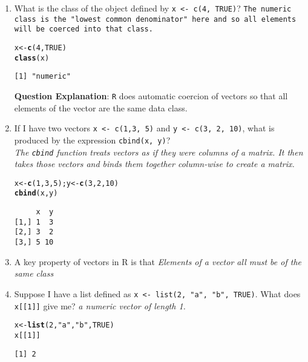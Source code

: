 \documentclass{article}\usepackage[]{graphicx}\usepackage[]{color}
\makeatletter
\newcommand{\hlnum}[1]{\textcolor[rgb]{0.686,0.059,0.569}{#1}}%
\newcommand{\hlstr}[1]{\textcolor[rgb]{0.192,0.494,0.8}{#1}}%
\newcommand{\hlstd}[1]{\textcolor[rgb]{0.345,0.345,0.345}{#1}}%
\newcommand{\hlkwb}[1]{\textcolor[rgb]{0.69,0.353,0.396}{#1}}%
\newcommand{\hlkwd}[1]{\textcolor[rgb]{0.737,0.353,0.396}{\textbf{#1}}}%
\newenvironment{kframe}{%
 \def\at@end@of@kframe{}%
 \ifinner\ifhmode%
  \def\at@end@of@kframe{\end{minipage}}%
  \begin{minipage}{\columnwidth}%
 \fi\fi%
 \def\FrameCommand##1{\hskip\@totalleftmargin \hskip-\fboxsep
 \colorbox{shadecolor}{##1}\hskip-\fboxsep
     \hskip-\linewidth \hskip-\@totalleftmargin \hskip\columnwidth}%
 \MakeFramed {\advance\hsize-\width
   \@totalleftmargin\z@ \linewidth\hsize
   \@setminipage}}%
 {\par\unskip\endMakeFramed%
 \at@end@of@kframe}
\newenvironment{knitrout}{}{} %
\makeatother
\begin{document}
\begin{enumerate}
  \item What is the class of the object defined by \texttt{x <- c(4, TRUE)}?
  \texttt{The numeric class is the "lowest common denominator" here and so all elements will be coerced into that class.}
\begin{knitrout}
\color{fgcolor}\begin{kframe}
\begin{alltt}
  \hlstd{x} \hlkwb{<-} \hlkwd{c}\hlstd{(}\hlnum{4}\hlstd{,} \hlnum{TRUE}\hlstd{)}
  \hlkwd{class}\hlstd{(x)}
\end{alltt}
\begin{verbatim}
[1] "numeric"
\end{verbatim}
\end{kframe}
\end{knitrout}
  \textbf{Question Explanation}: \texttt{R} does automatic coercion of vectors so that all elements of the vector are the same data class.
  
  \item If I have two vectors \texttt{x <- c(1,3, 5)} and \texttt{y <- c(3, 2, 10)}, what is produced by the expression \texttt{cbind(x, y)}?\\
  \emph{The \texttt{cbind} function treats vectors as if they were columns of a matrix. It then takes those vectors and binds them together column-wise to create a matrix.}
\begin{knitrout}
\color{fgcolor}\begin{kframe}
\begin{alltt}
  \hlstd{x} \hlkwb{<-} \hlkwd{c}\hlstd{(}\hlnum{1}\hlstd{,}\hlnum{3}\hlstd{,} \hlnum{5}\hlstd{); y} \hlkwb{<-} \hlkwd{c}\hlstd{(}\hlnum{3}\hlstd{,} \hlnum{2}\hlstd{,} \hlnum{10}\hlstd{)}
  \hlkwd{cbind}\hlstd{(x, y)}
\end{alltt}
\begin{verbatim}
     x  y
[1,] 1  3
[2,] 3  2
[3,] 5 10
\end{verbatim}
\end{kframe}
\end{knitrout}
    
  \item A key property of vectors in R is that
  \emph{Elements of a vector all must be of the same class}
  
  \item Suppose I have a list defined as \texttt{x <- list(2, "a", "b", TRUE)}. What does \texttt{x[[1]]} give me?
  \emph{a numeric vector of length 1.}
\begin{knitrout}
\color{fgcolor}\begin{kframe}
\begin{alltt}
  \hlstd{x} \hlkwb{<-} \hlkwd{list}\hlstd{(}\hlnum{2}\hlstd{,} \hlstr{"a"}\hlstd{,} \hlstr{"b"}\hlstd{,} \hlnum{TRUE}\hlstd{)}
  \hlstd{x[[}\hlnum{1}\hlstd{]]}
\end{alltt}
\begin{verbatim}
[1] 2
\end{verbatim}
\end{kframe}
\end{knitrout}


\end{enumerate}
\end{document}
